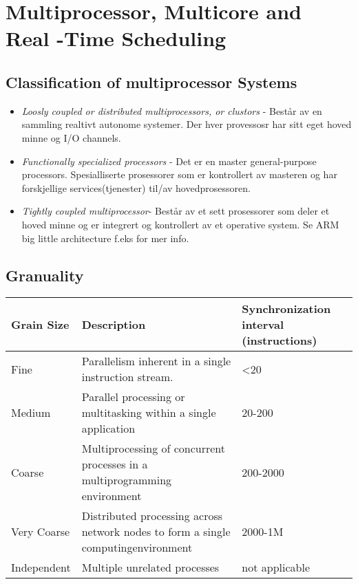 \chapter{Multiprocessor,
Multicore
and Real
-Time
Scheduling}

\section{Classification of multiprocessor Systems}
\begin{itemize}
\item 
\emph{Loosly coupled or distributed multiprocessors, or clustors} - Består av en sammling realtivt autonome systemer. Der hver provessosr har sitt eget hoved minne og I/O channels.
\item 
\emph{Functionally specialized processors} - Det er en master general-purpose processors. Spesialliserte prosessorer som er kontrollert av masteren og har forskjellige services(tjenester) til/av hovedprosessoren.
\item 
\emph{Tightly coupled multiprocessor}- Består av et sett prosessorer som deler et hoved minne og er integrert og kontrollert av et operative system. Se ARM big little architecture f.eks for mer info.
\end{itemize}

\section{Granuality}

\begin{center}
    \begin{tabular}{ | l | p{7cm} | p{3cm} |}
    \hline
    Grain Size & Description & Synchronization interval (instructions) \\ \hline
    Fine & Parallelism inherent in a single instruction stream. & <20  \\ \hline
    Medium & Parallel processing or multitasking within a single application & 20-200 \\ \hline
    Coarse & Multiprocessing of concurrent processes in a multiprogramming environment & 200-2000 \\ \hline
	Very Coarse & Distributed processing across network nodes to form a single computingenvironment & 2000-1M \\ \hline
	Independent &  Multiple unrelated processes & not applicable \\ \hline
    \end{tabular}
\end{center}

